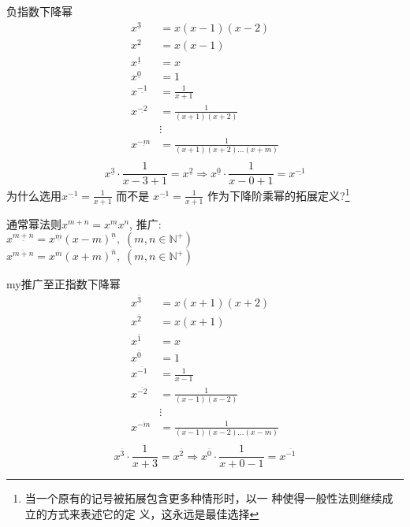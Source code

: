 \documentclass[mode=geye]{elegantnote}
\newcommand{\fallingfactorial}[1]{%
  ^{\underline{#1}}%
}
\newcommand{\risingfactorial}[1]{%
  ^{\overline{#1}}%
}
\begin{document}
负指数下降幂
\begin{align*}
    x\fallingfactorial{3}  &= x(x-1)(x-2) \\
    x\fallingfactorial{2}  &= x(x-1) \\
    x\fallingfactorial{1}  &= x \\
    x\fallingfactorial{0}  &= 1 \\
    x\fallingfactorial{-1} &= \frac{1}{x+1} \\
    x\fallingfactorial{-2} &= \frac{1}{(x+1)(x+2)} \\
    &\vdots \\
    x\fallingfactorial{-m} &= \frac{1}{(x+1)(x+2)\dots(x+m)} \\
\end{align*}
\begin{equation*}
    x\fallingfactorial{3}\cdot \frac{1}{x-3+1} = x\fallingfactorial{2} \Rightarrow 
    x\fallingfactorial{0}\cdot \frac{1}{x-0+1} = x\fallingfactorial{-1}
\end{equation*}
为什么选用$ x\fallingfactorial{-1}=\frac{1}{x+1} $ 
而不是 $ x\fallingfactorial{-1}=\frac{1}{x+1} $ 作为下降阶乘幂的拓展定义?\footnote{当一个原有的记号被拓展包含更多种情形时，以一
种使得一般性法则继续成立的方式来表述它的定
义，这永远是最佳选择}

通常幂法则$ x^{m+n}=x^m x^n $, 
推广:\\
{\color{red}$ x\fallingfactorial{m+n} = x\fallingfactorial{m}(x-m)\fallingfactorial{n},\;(m,n\in\mathbb{N}^+) $ }\\
{\color{red}$ x\risingfactorial{m+n} = x\risingfactorial{m}(x+m)\risingfactorial{n},\;(m,n\in\mathbb{N}^+) $ }

{my}推广至正指数下降幂
\begin{align*}
    x\risingfactorial{3}  &= x(x+1)(x+2) \\
    x\risingfactorial{2}  &= x(x+1) \\
    x\risingfactorial{1}  &= x \\
    x\risingfactorial{0}  &= 1 \\
    x\risingfactorial{-1} &= \frac{1}{x-1} \\
    x\risingfactorial{-2} &= \frac{1}{(x-1)(x-2)} \\
    &\vdots \\
    x\risingfactorial{-m} &= \frac{1}{(x-1)(x-2)\dots(x-m)} \\
\end{align*}
\begin{equation*}
    x\risingfactorial{3}\cdot \frac{1}{x+3} = x\risingfactorial{2} \Rightarrow 
    x\risingfactorial{0}\cdot \frac{1}{x+0-1} = x\risingfactorial{-1}
\end{equation*}
\end{document}
